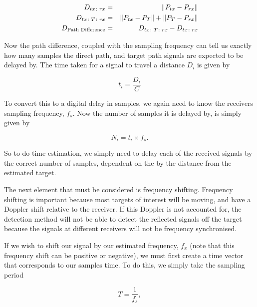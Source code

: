 \documentclass[12pt,openany,a4paper]{book}
\begin{document}
\begin{eqnarray}
\label{eqn:dtxrx}
D_{tx\colon rx} & = & \| P_{tx} - P_{rx} \| \\
\label{eqn:dtxtrx}
D_{tx\colon T\colon rx} & = & \| P_{tx} - P_{T} \| + \| P_{T} - P_{rx} \| \\
\label{eqn:PD}
D_{ \textnormal{Path Difference}} & = & D_{tx\colon T\colon rx} - D_{tx\colon rx}
\end{eqnarray}

\bigskip

Now the path difference, coupled with the sampling frequency can tell us exactly how many samples the direct path, and target path signals are expected to be delayed by. The time taken for a signal to travel a distance $D_i$ is given by 

\begin{equation}
t_i = \frac{D_i}{C}
\end{equation}

\bigskip

To convert this to a digital delay in samples, we again need to know the receivers sampling frequency, $f_s$. Now the number of samples it is delayed by, is simply given by

\begin{equation}
N_i = t_i \times f_s.
\end{equation}

\bigskip

So to do time estimation, we simply need to delay each of the received signals by the correct number of samples, dependent on the by the distance from the estimated target.

\bigskip

The next element that must be considered is frequency shifting. Frequency shifting is important because most targets of interest will be moving, and have a Doppler shift relative to the receiver. If this Doppler is not accounted for, the detection method will not be able to detect the reflected signals off the target because the signals at different receivers will not be frequency synchronised.

\bigskip

If we wish to shift our signal by our estimated frequency, $f_x$ (note that this frequency shift can be positive or negative), we must first create a time vector that corresponds to our samples time. To do this, we simply take the sampling period

\begin{equation}
T = \frac{1}{f_s},
\end{equation}
\end{document}

